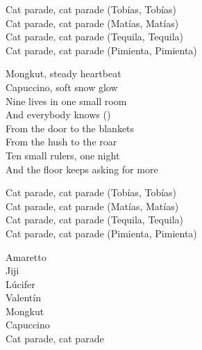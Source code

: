 \begin{lyrics}
Cat parade, cat parade
(Tobías, Tobías)\\
Cat parade, cat parade
(Matías, Matías)\\
Cat parade, cat parade
(Tequila, Tequila)\\
Cat parade, cat parade
(Pimienta, Pimienta)

Mongkut, steady heartbeat\\
Capuccino, soft snow glow\\
Nine lives in one small room\\
And everybody knows
()\\
From the door to the blankets\\
From the hush to the roar\\
Ten small rulers, one night\\
And the floor keeps asking for more

Cat parade, cat parade
(Tobías, Tobías)\\
Cat parade, cat parade
(Matías, Matías)\\
Cat parade, cat parade
(Tequila, Tequila)\\
Cat parade, cat parade
(Pimienta, Pimienta)

Amaretto\\
Jiji\\
Lúcifer\\
Valentín\\
Mongkut\\
Capuccino\\
Cat parade, cat parade
\end{lyrics}

